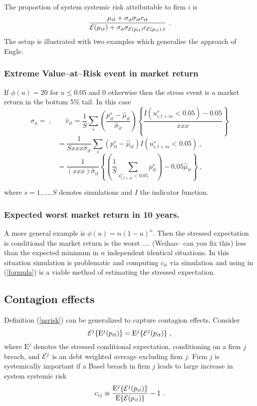 \documentclass[authoryear]{elsarticle}
\newcommand{\E}{\mathrm{E}}
\newcommand{\Ex}{{\cal E}}
\newcommand{\eref}[1]{(\ref{#1})}
\newcommand{\cq}{\ , \qquad}
\newcommand{\be}[1]{\begin{equation}\label{#1}}
\newcommand{\ee}{\end{equation}}
\begin{document}
 The proportion of system systemic risk attributable to firm $i$ is
$$
\frac{\mu_{it} +\sigma_\phi\sigma_{it}c_{it}}{\Ex(\mu_{it}) +\sigma_\phi\sigma_{\Ex(p_{it})}c_{\Ex(p_{it}),t}}\ .
$$ 
The setup is illustrated with two examples which generalise the approach of Engle.

\subsubsection{Extreme Value--at--Risk event in market return} 

If  $\phi(u)=20$ for $u\le 0.05$ and 0 otherwise then the stress event is a market return in the bottom 5\% tail.   In this case 
$$
\sigma_\phi = \cq \hat c_{it} =\frac{1}{S} \sum_s \left( \frac{p_{it}^s - \hat\mu_{it}}{\hat \sigma_{it}}\right)\left\{\frac{I(u^s_{i,t+m}<0.05)-0.05}{xxx}\right\}
$$$$
=\frac{1}{Sxxx\hat \sigma_{it}} \sum_s \left(p_{it}^s - \hat\mu_{it}\right)I(u^s_{i,t+m}<0.05)\ ,
$$$$
=\frac{1}{(xxx)\hat \sigma_{it}}\left\{\left(\frac{1}{S} \sum_{u^s_{i,t+m}<0.05} p_{it}^s \right)- 0.05\hat\mu_{it}\right\}\ ,
$$

where $s=1,\ldots,S$ denotes simulations and $I$ the indicator function. 

\subsubsection{Expected worst market return in 10 years.} 
 A more general example is $\phi(u)=n(1-u)^n$.  Then the stressed expectation is conditional the market return is the worst .... (Weihao-- can you fix this)  less than the expected minimum in $n$ independent identical situations.   In this situation simulation is problematic and computing $c_{it}$ via simulation  and using in  \eref{formula} is a viable method of estimating the stressed expectation.

 

\subsection{Contagion effects}
Definition \eref{nsrisk} can be generalized to capture contagion effects.  Consider 
\be{cont}
\Ex^j\{\E^j(p_{it})\}=\E^j\{\Ex^j(p_{it})\}\ ,
\ee
where  $\E^j$ denotes the stressed conditional expectation, conditioning on a firm $j$ breach, and $\Ex^j$ is an debt weighted average excluding firm $j$.  Firm $j$ is systemically important  if a Basel breach in firm $j$ leads to large increase in system systemic risk
$$
c_{ij}\equiv \frac{\E^j\{\Ex^j(p_{it})\}}{\E\{\Ex(p_{it})\}}-1\ .
$$
\end{document}
